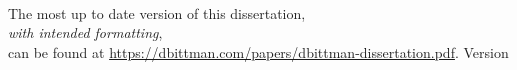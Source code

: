 {}

\begingroup
\let\clearpage\relax
\let\cleardoublepage\relax
\let\cleardoublepage\relax

\vspace*{40mm}
\begin{center}
    {
        \Large {}
    }\\
    \vspace*{20mm}
    The most up to date version of this dissertation,\\
    \emph{with intended formatting},\\
    can be found at \url{https://dbittman.com/papers/dbittman-dissertation.pdf}.
    \medskip
    Version \myVersion
\end{center}
\vfill

\endgroup

